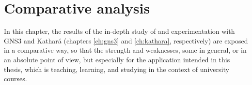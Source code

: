 
\chapter{Comparative analysis}
\label{ch:comparative}

In this chapter, the results of the in-depth study of and experimentation with GNS3 and Kathará (chapters \ref{ch:gns3} and \ref{ch:kathara}, respectively) are exposed in a comparative way, so that the strength and weaknesses, some in general, or in an absolute point of view, but especially for the application intended in this thesis, which is teaching, learning, and studying in the context of university courses.







